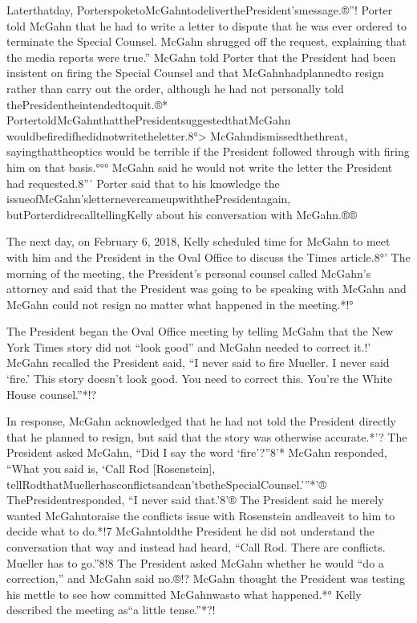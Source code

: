 Laterthatday, PorterspoketoMcGahntodeliverthePresident'smessage.®”!
Porter told McGahn that he had to write a letter to dispute that he was ever ordered to terminate the Special Counsel.
McGahn shrugged off the request, explaining that the media reports were true.”
McGahn told Porter that the President had been insistent on firing the Special Counsel and that McGahnhadplannedto resign rather than carry out the order, although he had not personally told thePresidentheintendedtoquit.®*
PortertoldMcGahnthatthePresidentsuggestedthatMcGahn wouldbefiredifhedidnotwritetheletter.8°>
McGahndismissedthethreat, sayingthattheoptics would be terrible if the President followed through with firing him on that basis.°°°
McGahn said he would not write the letter the President had requested.8”'
Porter said that to his knowledge the
issueofMcGahn'sletternevercameupwiththePresidentagain, butPorterdidrecalltellingKelly about his conversation with McGahn.®®

The next day, on February 6, 2018, Kelly scheduled time for McGahn to meet with him and the President in the Oval Office to discuss the Times article.8°'
The morning of the meeting, the President's personal counsel called McGahn's attorney and said that the President was going to be speaking with McGahn and McGahn could not resign no matter what happened in the meeting.*!°

The President began the Oval Office meeting by telling McGahn that the New York Times story did not “look good” and McGahn needed to correct it.!'
McGahn recalled the President said, “I never said to fire Mueller.
I never said ‘fire.'
This story doesn't look good.
You need to correct this.
You're the White House counsel.”*!?

In response, McGahn acknowledged that he had not told the President directly that he planned to resign, but said that the story was otherwise accurate.*'?
The President asked McGahn, “Did I say the word ‘fire'?”8'*
McGahn responded, “What you said is, ‘Call Rod [Rosenstein], tellRodthatMuellerhasconflictsandcan'tbetheSpecialCounsel.'”*'®
ThePresidentresponded, “I never said that.'8'®
The President said he merely wanted McGahntoraise the conflicts issue with Rosenstein andleaveit to him to decide what to do.*!7
McGahntoldthe President he did not understand the conversation that way and instead had heard, “Call Rod. There are conflicts. Mueller has to go.”8!8
The President asked McGahn whether he would “do a correction,” and McGahn said no.®!?
McGahn thought the President was testing his mettle to see how committed McGahnwasto what happened.*°
Kelly described the meeting as“a little tense.”*?!


